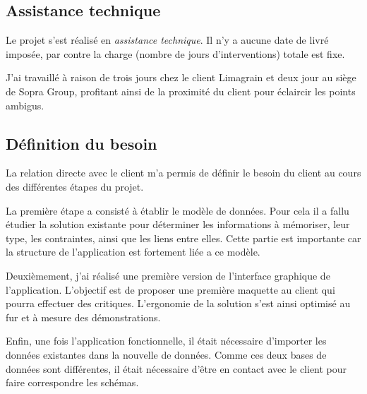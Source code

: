 \subsection{Assistance technique}


Le projet s'est réalisé en \textit{assistance technique}. Il n'y a aucune date de livré imposée, par contre la charge (nombre de jours d'interventions) totale est fixe.

J'ai travaillé à raison de trois jours chez le client Limagrain et deux jour au siège de Sopra Group, profitant ainsi de la proximité du client pour éclaircir les points ambigus.


\subsection{Définition du besoin}

La relation directe avec le client m'a permis de définir le besoin du client au cours des différentes étapes du projet.

La première étape a consisté à établir le modèle de données. Pour cela il a fallu étudier la solution existante pour déterminer les informations à mémoriser, leur type, les contraintes, ainsi que les liens entre elles. Cette partie est importante car la structure de l'application est fortement liée a ce modèle.

Deuxièmement, j'ai réalisé une première version de l'interface graphique de l'application. L'objectif est de proposer une première maquette au client qui pourra effectuer des critiques. L'ergonomie de la solution s'est ainsi optimisé au fur et à mesure des démonstrations.

Enfin, une fois l'application fonctionnelle, il était nécessaire d'importer les données existantes dans la nouvelle de données. Comme ces deux bases de données sont différentes, il était nécessaire d'être en contact avec le client pour faire correspondre les schémas.


